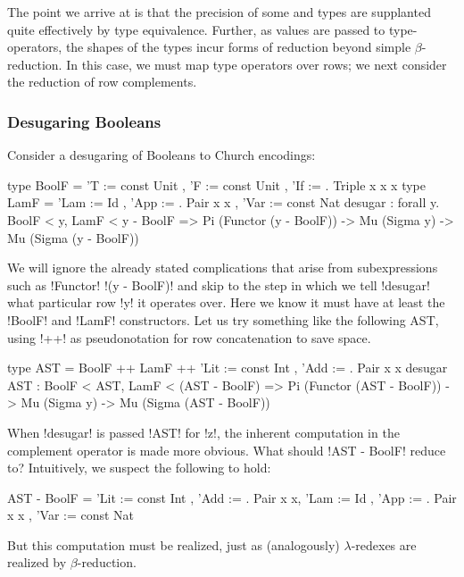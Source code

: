 \documentclass[sigplan,10pt,anonymous,review]{acmart}\settopmatter{printfolios=true,printccs=false,printacmref=false}
\begin{document}
The point we arrive at is that the precision of some \RO and \Rome types are supplanted quite effectively by type equivalence. Further, as values are passed to type-operators, the shapes of the types incur forms of reduction beyond simple $\beta$-reduction. In this case, we must map type operators over rows; we next consider the reduction of row complements.


\subsubsection{Desugaring Booleans} Consider a desugaring of Booleans to Church encodings:

\begin{rosi}
type BoolF = { 'T := const Unit , 
               'F := const Unit , 
               'If := \x. Triple x x x}
type LamF  = { 'Lam := Id , 
               'App := \x. Pair x x , 
               'Var := const Nat }
desugar : forall y. BoolF < y, LamF < y - BoolF =>
          Pi (Functor (y - BoolF)) -> 
          Mu (Sigma y) -> 
          Mu (Sigma (y - BoolF))
\end{rosi}

We will ignore the already stated complications that arise from subexpressions such as !Functor! !(y - BoolF)! and skip to the step in which we tell !desugar! what particular row !y! it operates over. Here we know it must have at least the !BoolF! and !LamF! constructors. Let us try something like the following AST, using !++! as pseudonotation for row concatenation to save space.

\begin{rosi}
type AST = BoolF ++ LamF ++ 
          {'Lit := const Int , 'Add := \x. Pair x x }
desugar AST : BoolF < AST, LamF < (AST - BoolF) =>
              Pi (Functor (AST - BoolF)) -> 
              Mu (Sigma y) -> Mu (Sigma (AST - BoolF))
\end{rosi}

\Ni When !desugar! is passed !AST! for !z!, the inherent computation in the complement operator is made more obvious. What should !AST - BoolF! reduce to? Intuitively, we suspect the following to hold: 

\begin{rosi} 
AST - BoolF = {'Lit := const Int , 
               'Add := \x. Pair x x, 
               'Lam := Id , 
               'App := \x. Pair x x , 
               'Var := const Nat }
\end{rosi}

\Ni But this computation must be realized, just as (analogously) $\lambda$-redexes are realized by $\beta$-reduction.
\end{document}
